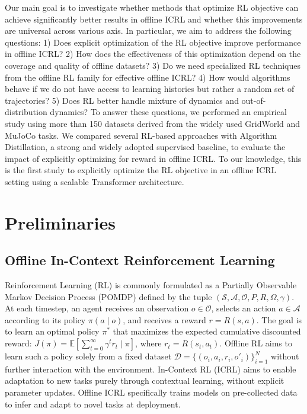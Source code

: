 \documentclass{article}
\begin{document}
Our main goal is to investigate whether methods that optimize RL objective can achieve significantly better results in offline ICRL and whether this improvements are universal across various axis. In particular, we aim to address the following questions: 1) Does explicit optimization of the RL objective improve performance in offline ICRL?
2) How does the effectiveness of this optimization depend on the coverage and quality of offline datasets?
3) Do we need specialized RL techniques from the offline RL family for effective offline ICRL?
4) How would algorithms behave if we do not have access to learning histories but rather a random set of trajectories?
5) Does RL better handle mixture of dynamics and out-of-distribution dynamics?
To answer these questions, we performed an empirical study using more than 150 datasets derived from the widely used GridWorld and MuJoCo \citep{todorov2012mujoco} tasks. We compared several RL-based approaches with Algorithm Distillation, a strong and widely adopted supervised baseline, to evaluate the impact of explicitly optimizing for reward in offline ICRL. To our knowledge, this is the first study to explicitly optimize the RL objective in an offline ICRL setting using a scalable Transformer architecture.
\section{Preliminaries}
\subsection{Offline In-Context Reinforcement Learning}
Reinforcement Learning (RL) is commonly formulated as a Partially Observable Markov Decision Process (POMDP) defined by the tuple $(\mathcal{S}, \mathcal{A}, \mathcal{O}, P, R, \Omega, \gamma)$. At each timestep, an agent receives an observation $o \in \mathcal{O}$, selects an action $a \in \mathcal{A}$ according to its policy $\pi(a \mid o)$, and receives a reward $r = R(s, a)$. The goal is to learn an optimal policy $\pi^*$ that maximizes the expected cumulative discounted reward: $J(\pi) = \mathbb{E} \left[ \sum_{t=0}^{\infty} \gamma^t r_t \mid \pi \right]$, where $r_t = R(s_t, a_t)$. Offline RL \citep{levine2020offline} aims to learn such a policy solely from a fixed dataset $\mathcal{D} = \{(o_i, a_i, r_i, o'_i)\}_{i=1}^{N}$ without further interaction with the environment. In-Context RL (ICRL) \citep{moeini2025survey} aims to enable adaptation to new tasks purely through contextual learning, without explicit parameter updates. Offline ICRL specifically trains models on pre-collected data to infer and adapt to novel tasks at deployment.
\end{document}
